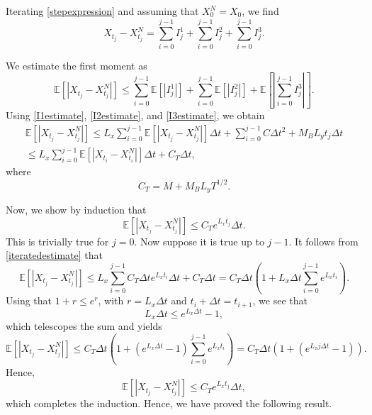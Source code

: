 \documentclass[reqno,12pt]{amsart}
\theoremstyle{plain}%
\theoremstyle{definition}
\begin{document}
Iterating \eqref{stepexpression} and assuming that $X_0^N = X_0$, we find
\begin{equation}
  \label{iteratedexpression}
  X_{t_j} - X_{t_j}^N = \sum_{i=0}^{j-1} I_j^1 + \sum_{i=0}^{j-1} I_j^2 + \sum_{i=0}^{j-1} I_j^3.
\end{equation}

We estimate the first moment as
\begin{equation}
 \mathbb{E}\left[| X_{t_j} - X_{t_j}^N |\right] \leq \sum_{i=0}^{j-1} \mathbb{E}\left[| I_j^1|\right] + \sum_{i=0}^{j-1} \mathbb{E}\left[|I_j^2 |\right] + \mathbb{E}\left[ \left| \sum_{i=0}^{j-1} I_j^3 \right| \right].
\end{equation}
Using \eqref{I1estimate}, \eqref{I2estimate}, and \eqref{I3estimate}, we obtain
\begin{multline}
\label{iteratedestimate}
 \mathbb{E}\left[| X_{t_j} - X_{t_j}^N |\right] \leq L_x \sum_{i=0}^{j-1} \mathbb{E}\left[|X_{t_j} - X_{t_j}^N|\right]\Delta t + \sum_{i=0}^{j-1} C\Delta t^2 + M_B L_y t_j \Delta t \\
 \leq L_x \sum_{i=0}^{j-1} \mathbb{E}\left[|X_{t_i} - X_{t_i}^N|\right]\Delta t + C_T \Delta t,
\end{multline}
where
$$
C_T = M + M_B L_yT^{1/2}.
$$

Now, we show by induction that
$$
 \mathbb{E}\left[| X_{t_j} - X_{t_j}^N |\right] \leq C_T e^{L_x t_j}\Delta t .
$$
This is trivially true for $j=0$. Now suppose it is true up to $j-1$. It follows from \eqref{iteratedestimate} that
$$
 \mathbb{E}\left[| X_{t_j} - X_{t_j}^N |\right] \leq L_x \sum_{i=0}^{j-1} C_T \Delta t e^{L_x t_i}\Delta t + C_T \Delta t = C_T \Delta t\left( 1 + L_x \Delta t \sum_{i=0}^{j-1}  e^{L_x t_i} \right).
$$
Using that $1 + r \leq e^r$, with $r=L_x\Delta t$ and $t_i + \Delta t = t_{i+1}$, we see that
$$
L_x \Delta t \leq e^{L_x \Delta t} - 1,
$$
which telescopes the sum and yields
$$
 \mathbb{E}\left[| X_{t_j} - X_{t_j}^N |\right] \leq C_T \Delta t\left( 1 + (e^{L_x \Delta t} - 1)\sum_{i=0}^{j-1}  e^{L_x t_i} \right) = C_T \Delta t  \left(1 + (e^{L_x j\Delta t} - 1) \right).
$$
Hence,
$$
 \mathbb{E}\left[| X_{t_j} - X_{t_j}^N |\right] \leq C_T e^{L_x t_j}\Delta t ,
$$
which completes the induction. Hence, we have proved the following result.
\end{document}
